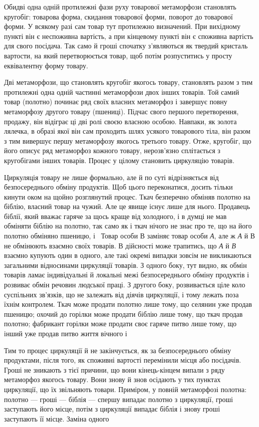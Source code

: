 Обидві одна одній протилежні фази руху товарової метаморфози
становлять кругобіг: товарова форма, скидання товарової
форми, поворот до товарової форми. У всякому разі сам товар
тут протилежно визначений. При вихідному пункті він є неспоживна
вартість, а при кінцевому пункті він є споживна вартість
для свого посідача. Так само й гроші спочатку з’являються як
твердий кристаль вартости, на який перетворюється товар, щоб
потім розпуститись у просту еквівалентну форму товару.

Дві метаморфози, що становлять кругобіг якогось товару,
становлять разом з тим протилежні одна одній частинні метаморфози
двох інших товарів. Той самий товар (полотно) починає ряд
своїх власних метаморфоз і завершує повну метаморфозу другого
товару (пшениці). Підчас свого першого перетворення, продажу,
він відіграє ці дві ролі своєю власною особою. Навпаки, як золота
лялечка, в образі якої він сам проходить шлях усякого товарового
тіла, він разом з тим вивершує першу метаморфозу якогось третього
товару. Отже, кругобіг, що його описує ряд метаморфоз
кожного товару, нерозв’язно сплітається з кругобігами інших
товарів. Процес у цілому становить циркуляцію товарів.

Циркуляція товару не лише формально, але й по суті відрізняється
від безпосереднього обміну продуктів. Щоб цього переконатися,
досить тільки кинути оком на щойно розглянутий процес.
Ткач безперечно обміняв полотно на біблію, власний товар на
чужий. Але це явище існує лише для нього. Продавець біблії,
який вважає гаряче за щось краще від холодного, і в думці не
мав обміняти біблію на полотно, так само як і ткач нічого не
знає про те, що на його полотно обміняно пшеницю, і~ Товар
особи В заміняє товар особи \emph{А}, але ж \emph{А} й \emph{}В не обмінюють взаємно
своїх товарів. В дійсності може трапитись, що \emph{А} й \emph{В} взаємно
купують один в одного, але такі окремі випадки зовсім не викликаються
загальними відносинами циркуляції товарів. З одного
боку, тут видно, як обмін товарів ламає індивідуальні й локальні
межі безпосереднього обміну продуктів і розвиває обмін
речовин людської праці. З другого боку, розвивається ціле коло
суспільних зв’язків, що не залежать від діячів циркуляції,
і тому лежать поза їхнім контролем. Ткач може продати полотно
лише тому, що селянин уже продав пшеницю; охочий до горілки
може продати біблію лише тому, що ткач продав полотно; фабрикант
горілки може продати своє гаряче питво лише тому, що інший
уже продав питво життя вічного і~

Тим то процес циркуляції й не закінчується, як за безпосереднього
обміну продуктами, після того, як споживні вартості
перемінили місця або посідачів. Гроші не зникають з тієї причини,
що вони кінець-кінцем випали з ряду метаморфоз якогось
товару. Вони знову й знов осідають у тих пунктах циркуляції,
що їх звільняють товари. Приміром, у повній метаморфозі полотна:
полотно — гроші — біблія — спершу випадає полотно з
циркуляції, гроші заступають його місце, потім з циркуляції
випадає біблія і знову гроші заступають її місце. Заміна одного
\parbreak{}  %
